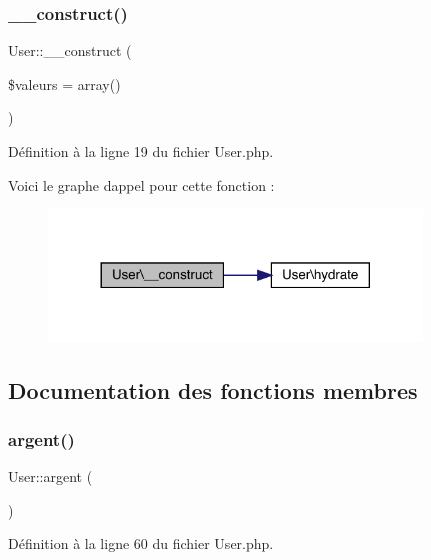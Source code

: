 \subsubsection{\texorpdfstring{\+\_\+\+\_\+construct()}{\_\_construct()}}
{\footnotesize\ttfamily User\+::\+\_\+\+\_\+construct (\begin{DoxyParamCaption}\item[{}]{\$valeurs = {\ttfamily array()} }\end{DoxyParamCaption})}



Définition à la ligne 19 du fichier User.\+php.

Voici le graphe d\textquotesingle{}appel pour cette fonction \+:\nopagebreak
\begin{figure}[H]
\begin{center}
\leavevmode
\includegraphics[width=281pt]{class_user_ae07b9dba276956c8b8f89c8c46ff6af5_cgraph}
\end{center}
\end{figure}


\subsection{Documentation des fonctions membres}
\mbox{\label{class_user_a2a6a97a5e1ddb08da30802aec1b0eb0a}} 
\subsubsection{\texorpdfstring{argent()}{argent()}}
{\footnotesize\ttfamily User\+::argent (\begin{DoxyParamCaption}{ }\end{DoxyParamCaption})}



Définition à la ligne 60 du fichier User.\+php.

